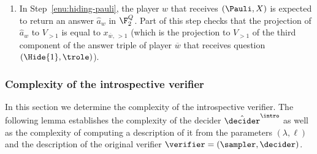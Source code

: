 \begin{enumerate}
  The decider also has to compute $( \Lfunc )^\perp (x_{w,\, k+1})$.
  According to Definition~\ref{def:Lperp}, this requires specifying a basis for
  $\ker( \Lfunc )^\perp$.
  To compute the value, the decider performs the following steps:
	\begin{enumerate}
  \item Call $\sampler$ on input $(N, \trole, \gamestyle{factor}, k+1, y_{\overline{w},\, \le k})$ to
    obtain a subset $H = \{h_1,\ldots,h_m\}$ of the canonical basis for
    $\F_2^{s(N)}$ that is a basis of the register subspace $V^\trole_{k+1}(y_{\overline{w}})$.
  \item For $i \in \{1, 2, \ldots, m\}$ compute $c_i = \sampler(N, \trole,
    \gamestyle{linear}, k+1, y_{\overline{w},\, \le k}, h_i)$.
    Compute a matrix representation $M$ for $ \Lfunc $ in the basis
    $H$, whose columns are the vectors $c_1, \ldots, c_m$ as elements of
    $V^\trole_{k+1}(y_{\overline{w}})$.

  \item Using a canonical algorithm for Gaussian elimination, compute a basis
    $F$ for $\ker(M)$.

  \item Compute the canonical complement $S$ of $F$, as in
    Definition~\ref{def:canonical-complement}.
    $S$ is a basis for $\ker( \Lfunc )^\perp$.

  \item To compute $(\Lfunc)^\perp$ on input
    $x_{w,\, k+1}$, compute the canonical linear map with kernel basis
    $S$ (see Definition~\ref{def:cl-canonical}) on input $x_{w,\,
      k+1}$.
  \end{enumerate}

\item In Step~\ref{enu:hiding-pauli}, the player $w$ that receives $(\Pauli,X)$
  is expected to return an answer $\hat{a}_w$ in $\F_2^Q$.
  Part of this step checks that the projection of $\hat{a}_w$ to $V_{>1}$ is
  equal to $x_{\overline{w},\, >1}$ (which is the projection to $V_{>1}$ of the
  third component of the answer triple of player $\overline{w}$ that receives
  question $(\Hide{1},\trole)$).
\end{enumerate}

\subsubsection{Complexity of the introspective verifier}
\label{sec:intro-complexity}

In this section we determine the complexity of the introspective verifier.
The following lemma establishes the complexity of the decider $\tdint$
as well as the complexity of computing a {description} of it from the parameters
$(\lambda,\ell)$ and the description of the original verifier $\verifier =
(\sampler,\decider)$.

